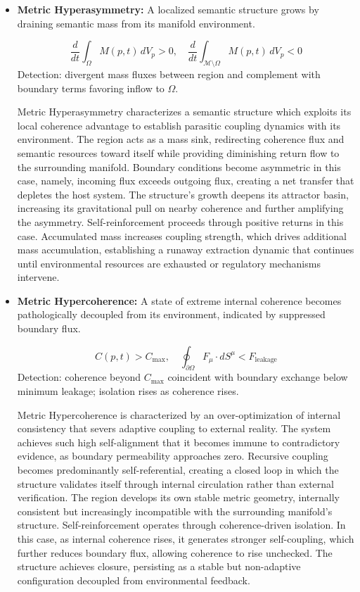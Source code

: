 \begin{itemize}
    
    \item \textbf{Metric Hyperasymmetry:} A localized semantic structure grows by draining semantic mass from its manifold environment.

    \begin{equation}
    \frac{d}{dt}\int_{\Omega} M(p,t) \, dV_p > 0, \quad \frac{d}{dt}\int_{\mathcal{M}\setminus\Omega} M(p,t) \, dV_p < 0
    \end{equation}
    Detection: divergent mass fluxes between region and complement with boundary terms favoring inflow to \(\Omega\).

    Metric Hyperasymmetry characterizes a semantic structure which exploits its local coherence advantage to establish parasitic coupling dynamics with its environment. The region acts as a mass sink, redirecting coherence flux and semantic resources toward itself while providing diminishing return flow to the surrounding manifold. Boundary conditions become asymmetric in this case, namely, incoming flux exceeds outgoing flux, creating a net transfer that depletes the host system. The structure's growth deepens its attractor basin, increasing its gravitational pull on nearby coherence and further amplifying the asymmetry. Self-reinforcement proceeds through positive returns in this case. Accumulated mass increases coupling strength, which drives additional mass accumulation, establishing a runaway extraction dynamic that continues until environmental resources are exhausted or regulatory mechanisms intervene.

    \item \textbf{Metric Hypercoherence:} A state of extreme internal coherence becomes pathologically decoupled from its environment, indicated by suppressed boundary flux.

    \begin{equation}
    C(p,t) > C_{\text{max}}, \quad \oint_{\partial \Omega} F_\mu \cdot dS^\mu < F_{\text{leakage}}
    \end{equation}
    Detection: coherence beyond \(C_{\text{max}}\) coincident with boundary exchange below minimum leakage; isolation rises as coherence rises.

    Metric Hypercoherence is characterized by an over-optimization of internal consistency that severs adaptive coupling to external reality. The system achieves such high self-alignment that it becomes immune to contradictory evidence, as boundary permeability approaches zero. Recursive coupling becomes predominantly self-referential, creating a closed loop in which the structure validates itself through internal circulation rather than external verification. The region develops its own stable metric geometry, internally consistent but increasingly incompatible with the surrounding manifold's structure. Self-reinforcement operates through coherence-driven isolation. In this case, as internal coherence rises, it generates stronger self-coupling, which further reduces boundary flux, allowing coherence to rise unchecked. The structure achieves closure, persisting as a stable but non-adaptive configuration decoupled from environmental feedback.
    

\end{itemize}
